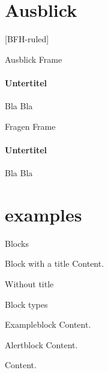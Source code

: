 \documentclass[
    ngerman,%
    authorontitle=true,
]{bfhbeamer}
\begin{document}
    \section{Ausblick}\label{sec:ausblick}
    [BFH-ruled]
    \frame{\sectionpage}

    \begin{frame}{Ausblick Frame}
        \framesubtitle{Untertitel}
        Bla Bla
    \end{frame}

    \begin{frame}{Fragen Frame}
        \framesubtitle{Untertitel}
        Bla Bla
    \end{frame}


    \section{examples}\label{sec:examples}
    \begin{frame}{Blocks}
        \begin{block}{Block with a title}
            Content.
        \end{block}
        \begin{block}{}
            Without title
        \end{block}
    \end{frame}

    \begin{frame}{Block types}
        \begin{exampleblock}{Exampleblock}
            Content.
        \end{exampleblock}
        \begin{alertblock}{Alertblock}
            Content.
        \end{alertblock}
        \begin{example}
            Content.
        \end{example}
    \end{frame}
\end{document}
